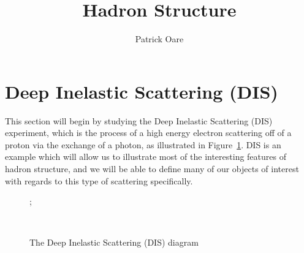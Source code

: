 \documentclass[11pt, oneside]{article}   	%
\title{Hadron Structure}
\author{Patrick Oare}
\date{}							%
\theoremstyle{definition}
\begin{document}
\maketitle

\section{Deep Inelastic Scattering (DIS)}

This section will begin by studying the Deep Inelastic Scattering (DIS) experiment, which is the process of a high energy electron scattering 
off of a proton via the exchange of a photon, as illustrated in Figure~\ref{fig:dis}. DIS is an example which will allow us to illustrate most of the 
interesting features of hadron structure, and we will be able to define many of our objects of interest with regards to this type of scattering 
specifically. 

\begin{figure}[H]
\centering
{};
\caption{The Deep Inelastic Scattering (DIS) diagram}~
\label{fig:dis}
\end{figure}
\end{document}
